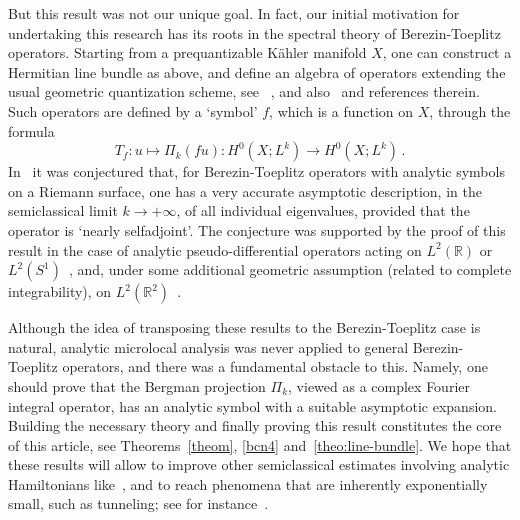 \documentclass{article}
\newcommand{\RM}{\mathbb{R}}
\begin{document}
But this result was not our unique goal.  In fact, our initial
motivation for undertaking this research has its roots in the spectral
theory of Berezin-Toeplitz operators. Starting from a prequantizable
Kähler manifold $X$, one can construct a Hermitian line bundle as
above, and define an algebra of operators extending the usual
geometric quantization scheme, see ~\cite{berezin75,BG}, and
also~\cite{charles-toeplitz,lefloch-book} and references therein.
Such operators are defined by a `symbol' $f$, which is a function on
$X$, through the formula
\[
T_f : u \mapsto \Pi_k (f u) : H^0(X;L^k) \to H^0(X;L^k)\,.
\]
In~\cite{rouby-17} it was conjectured that, for Berezin-Toeplitz
operators with analytic symbols on a Riemann surface, one has a very
accurate asymptotic description, in the semiclassical limit
$k\to+\infty$, of all individual eigenvalues, provided that the
operator is `nearly selfadjoint'. The conjecture was supported by the
proof of this result in the case of analytic pseudo-differential
operators acting on $L^2(\RM)$ or $L^2(S^1)$~\cite{rouby-17}, and,
under some additional geometric assumption (related to complete
integrability), on $L^2(\RM^2)$~\cite{melin-sjostrand-non,
  h-sj-04,h-sj-vn-07}.

Although the idea of transposing these results to the Berezin-Toeplitz
case is natural, analytic microlocal analysis was never applied to
general Berezin-Toeplitz operators, and there was a fundamental
obstacle to this. Namely, one should prove that the Bergman projection
$\Pi_k$, viewed as a complex Fourier integral operator, has an
analytic symbol with a suitable asymptotic expansion. Building the
necessary theory and finally proving this result constitutes the core
of this article, see Theorems~\ref{theom}, \ref{bcn4}
and~\ref{theo:line-bundle}. We hope that these results will allow to
improve other semiclassical estimates involving analytic Hamiltonians
like~\cite{hitr-mant-sjoe17}, and to reach phenomena that are
inherently exponentially small, such as tunneling; see for
instance~\cite{bonth-raym-vns19}.


\medskip
\end{document}
